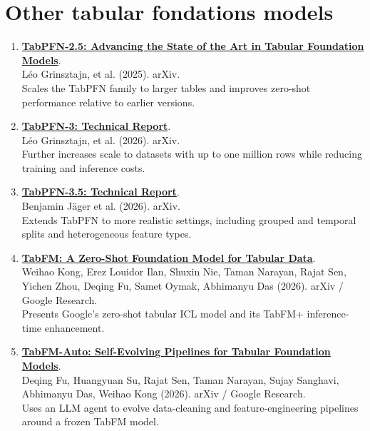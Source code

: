 \documentclass[9pt,a4paper]{extarticle}
\begin{document}
\section{Other tabular fondations models}
 \begin{enumerate}[resume]
\item \textbf{\href{https://arxiv.org/abs/2511.08667}{TabPFN-2.5: Advancing the State of the Art in Tabular Foundation Models}}.\\
L\'eo Grinsztajn, et al. (2025). arXiv.\\
 Scales the TabPFN family to larger tables and improves zero-shot performance relative to earlier versions.
\item \textbf{\href{https://arxiv.org/abs/2605.13986}{TabPFN-3: Technical Report}}.\\
L\'eo Grinsztajn, et al. (2026). arXiv.\\
 Further increases scale to datasets with up to one million rows while reducing training and inference costs.
\item \textbf{\href{https://arxiv.org/abs/2609.17895}{TabPFN-3.5: Technical Report}}.\\
Benjamin J\"ager et al. (2026). arXiv.\\
 Extends TabPFN to more realistic settings, including grouped and temporal splits and heterogeneous feature types.
\item \textbf{\href{https://arxiv.org/abs/2609.37959}{TabFM: A Zero-Shot Foundation Model for Tabular Data}}.\\
Weihao Kong, Erez Louidor Ilan, Shuxin Nie, Taman Narayan, Rajat Sen, Yichen Zhou, Deqing Fu, Samet Oymak, Abhimanyu Das (2026). arXiv / Google Research.\\
 Presents Google’s zero-shot tabular ICL model and its TabFM+ inference-time enhancement.
\item \textbf{\href{https://arxiv.org/abs/2609.37989}{TabFM-Auto: Self-Evolving Pipelines for Tabular Foundation Models}}.\\
Deqing Fu, Huangyuan Su, Rajat Sen, Taman Narayan, Sujay Sanghavi, Abhimanyu Das, Weihao Kong (2026). arXiv / Google Research.\\
 Uses an LLM agent to evolve data-cleaning and feature-engineering pipelines around a frozen TabFM model.
\end{enumerate}
\end{document}
